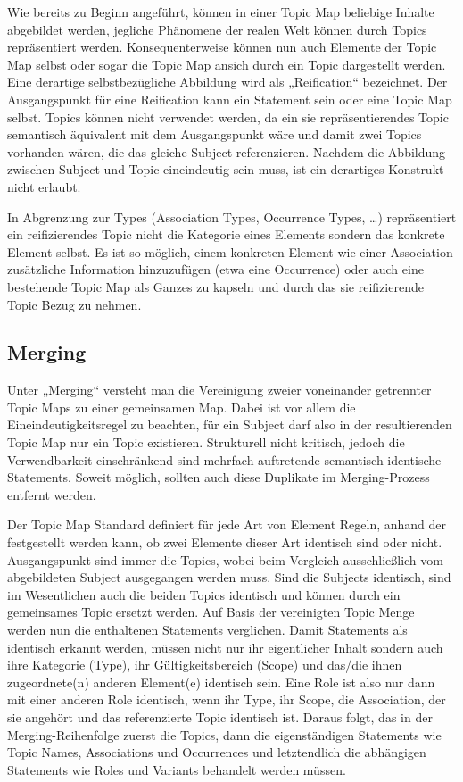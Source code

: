 Wie bereits zu Beginn angeführt, können in einer Topic Map beliebige Inhalte abgebildet werden, jegliche Phänomene der realen Welt können durch Topics repräsentiert werden. Konsequenterweise können nun auch Elemente der Topic Map selbst oder sogar die Topic Map ansich durch ein Topic dargestellt werden. Eine derartige selbstbezügliche Abbildung wird als „Reification“ bezeichnet. Der Ausgangspunkt für eine Reification kann ein Statement sein oder eine Topic Map selbst. Topics können nicht verwendet werden, da ein sie repräsentierendes Topic semantisch äquivalent mit dem Ausgangspunkt wäre und damit zwei Topics vorhanden wären, die das gleiche Subject referenzieren. Nachdem die Abbildung zwischen Subject und Topic eineindeutig sein muss, ist ein derartiges Konstrukt nicht erlaubt.

In Abgrenzung zur Types (Association Types, Occurrence Types, \ldots) repräsentiert ein reifizierendes Topic nicht die Kategorie eines Elements sondern das konkrete Element selbst. Es ist so möglich, einem konkreten Element wie einer Association zusätzliche Information hinzuzufügen (etwa eine Occurrence) oder auch eine bestehende Topic Map als Ganzes zu kapseln und durch das sie reifizierende Topic Bezug zu nehmen. 


\subsection{Merging} %
\label{ssub:merging}

Unter „Merging“ versteht man die Vereinigung zweier voneinander getrennter Topic Maps zu einer gemeinsamen Map. Dabei ist vor allem die Eineindeutigkeitsregel zu beachten, für ein Subject darf also in der resultierenden Topic Map nur ein Topic existieren. Strukturell nicht kritisch, jedoch die Verwendbarkeit einschränkend sind mehrfach auftretende semantisch identische Statements. Soweit möglich, sollten auch diese Duplikate im Merging-Prozess entfernt werden.

Der Topic Map Standard definiert für jede Art von Element Regeln, anhand der festgestellt werden kann, ob zwei Elemente dieser Art identisch sind oder nicht. Ausgangspunkt sind immer die Topics, wobei beim Vergleich ausschließlich vom abgebildeten Subject ausgegangen werden muss. Sind die Subjects identisch, sind im Wesentlichen auch die beiden Topics identisch und können durch ein gemeinsames Topic ersetzt werden. Auf Basis der vereinigten Topic Menge werden nun die enthaltenen Statements verglichen. Damit Statements als identisch erkannt werden, müssen nicht nur ihr eigentlicher Inhalt sondern auch ihre Kategorie (Type), ihr Gültigkeitsbereich (Scope) und das/die ihnen zugeordnete(n) anderen Element(e) identisch sein. Eine Role ist also nur dann mit einer anderen Role identisch, wenn ihr Type, ihr Scope, die Association, der sie angehört und das referenzierte Topic identisch ist. Daraus folgt, das in der Merging-Reihenfolge zuerst die Topics, dann die eigenständigen Statements wie Topic Names, Associations und Occurrences und letztendlich die abhängigen Statements wie Roles und Variants behandelt werden müssen.

